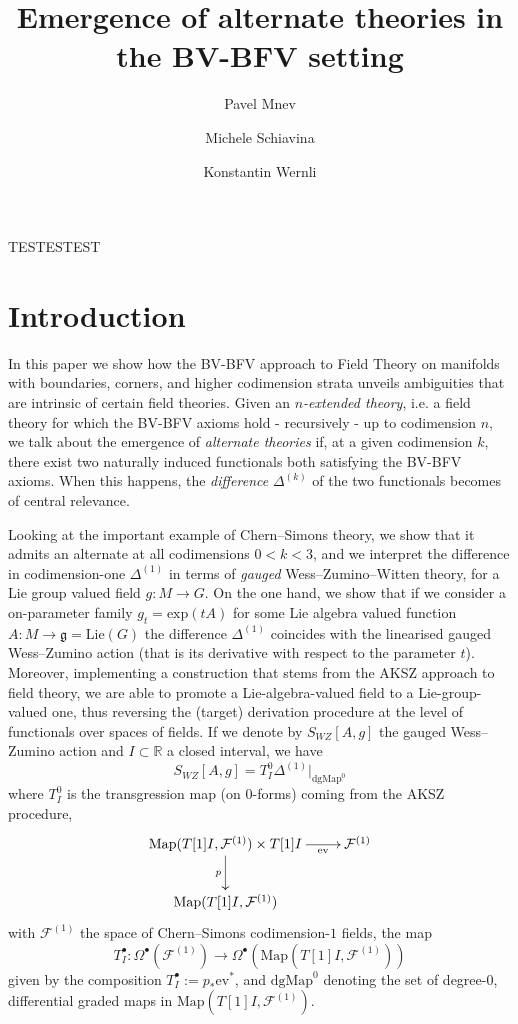 \documentclass[a4paper,reqno]{amsart}
\title{Emergence of alternate theories in the BV-BFV setting}
\author{Pavel Mnev}
\author{Michele Schiavina}
\author{Konstantin Wernli}
\begin{document}
\maketitle
TESTESTEST
\section{Introduction}
In this paper we show how the BV-BFV approach to Field Theory on manifolds with boundaries, corners, and higher codimension strata unveils ambiguities that are intrinsic of certain field theories. Given an \emph{$n$-extended theory}, i.e. a field theory for which the BV-BFV axioms hold - recursively - up to codimension $n$, we talk about the emergence of \emph{alternate theories} if, at a given codimension $k$, there exist two naturally induced functionals both satisfying the BV-BFV axioms. When this happens, the \emph{difference} $\Delta^{(k)}$ of the two functionals becomes of central relevance.

Looking at the important example of Chern--Simons theory, we show that it admits an alternate at all codimensions $0< k < 3$, and we interpret the difference in codimension-one $\Delta^{(1)}$ in terms of \emph{gauged} Wess--Zumino--Witten theory, for a Lie group valued field $g\colon M \longrightarrow G$. On the one hand, we show that if we consider a on-parameter family $g_t=\mathrm{exp}(tA)$ for some Lie algebra valued function $A\colon M\longrightarrow \mathfrak{g}=\mathrm{Lie}(G)$ the difference $\Delta^{(1)}$ coincides with the linearised gauged Wess--Zumino action (that is its derivative with respect to the parameter $t$). Moreover, implementing a construction that stems from the AKSZ approach to field theory, we are able to promote a Lie-algebra-valued field to a Lie-group-valued one, thus reversing the (target) derivation procedure at the level of functionals over spaces of fields. If we denote by $S_{WZ}[A,g]$ the gauged Wess--Zumino action and $I\subset \mathbb{R}$ a closed interval, we have
\begin{equation}
S_{WZ}[A,g]=T_{I}^0 \Delta^{(1)}\vert_{\mathrm{dgMap}^0}
\end{equation}
where $T_{I}^0$ is the transgression map (on $0$-forms) coming from the AKSZ procedure,
\begin{equation}
\xymatrix{
\mathrm{Map}(T[1]I, \mathcal{F}^{(1)})\times T[1]I \ar[d]_{p}   \ar[r]_-{\mathrm{ev}}  & \mathcal{F}^{(1)}\\
\mathrm{Map}(T[1]I, \mathcal{F}^{(1)}) & 
}
\end{equation}
with $\mathcal{F}^{(1)}$ the space of Chern--Simons codimension-$1$ fields, the map 
$$T^\bullet_I\colon\Omega^\bullet\left(\mathcal{F}^{(1)}\right)\longrightarrow \Omega^\bullet\left(\mathrm{Map}(T[1]I, \mathcal{F}^{(1)})\right)$$ 
given by the composition $T^\bullet_I:=p_* \mathrm{ev}^*$, and $\mathrm{dgMap}^{0}$ denoting the set of degree-$0$, differential graded maps in $\mathrm{Map}(T[1]I, \mathcal{F}^{(1)})$.
\end{document}
